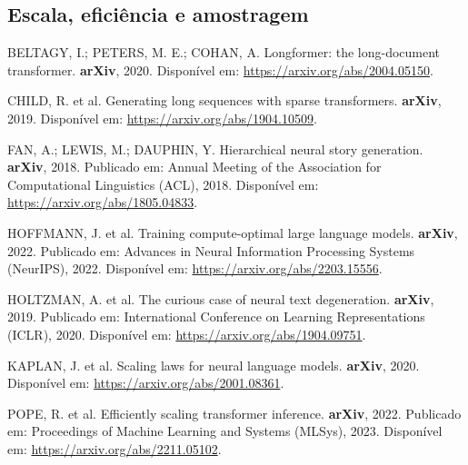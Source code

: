 \documentclass[11pt,a4paper]{article}
\begin{document}
\subsection{Escala, eficiência e amostragem}
BELTAGY, I.; PETERS, M. E.; COHAN, A. Longformer: the long-document transformer. \textbf{arXiv}, 2020. Disponível em: \url{https://arxiv.org/abs/2004.05150}.\par
CHILD, R. et al. Generating long sequences with sparse transformers. \textbf{arXiv}, 2019. Disponível em: \url{https://arxiv.org/abs/1904.10509}.\par
FAN, A.; LEWIS, M.; DAUPHIN, Y. Hierarchical neural story generation. \textbf{arXiv}, 2018. Publicado em: Annual Meeting of the Association for Computational Linguistics (ACL), 2018. Disponível em: \url{https://arxiv.org/abs/1805.04833}.\par
HOFFMANN, J. et al. Training compute-optimal large language models. \textbf{arXiv}, 2022. Publicado em: Advances in Neural Information Processing Systems (NeurIPS), 2022. Disponível em: \url{https://arxiv.org/abs/2203.15556}.\par
HOLTZMAN, A. et al. The curious case of neural text degeneration. \textbf{arXiv}, 2019. Publicado em: International Conference on Learning Representations (ICLR), 2020. Disponível em: \url{https://arxiv.org/abs/1904.09751}.\par
KAPLAN, J. et al. Scaling laws for neural language models. \textbf{arXiv}, 2020. Disponível em: \url{https://arxiv.org/abs/2001.08361}.\par
POPE, R. et al. Efficiently scaling transformer inference. \textbf{arXiv}, 2022. Publicado em: Proceedings of Machine Learning and Systems (MLSys), 2023. Disponível em: \url{https://arxiv.org/abs/2211.05102}.\par
\end{document}
